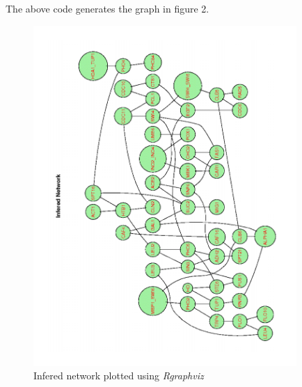 \documentclass{article}
\newcommand{\Rpackage}[1]{{\textit{#1}}}
\begin{document}
The above code generates the graph in figure 2.

\newpage
\begin{center}\begin{figure}
\label{fig:graph}
\caption{Infered network plotted using \Rpackage{Rgraphviz}}
\includegraphics[width=10cm,angle=270]{graph}
\end{figure}\end{center}
\newpage






\nocite{*}
\end{document}
